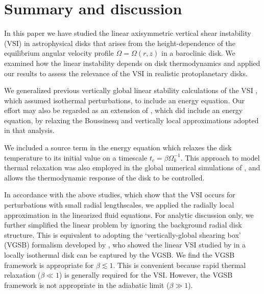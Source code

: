 \section{Summary and discussion}\label{summary}
In this paper we have studied the linear axisymmetric vertical shear
instability (VSI) in astrophysical disks that arises from the
height-dependence of the equilibrium angular velocity profile
$\Omega=\Omega(r,z)$ in a baroclinic disk. We examined how
the linear instability depends on disk thermodynamics and applied our
results to assess the relevance of the VSI in realistic protoplanetary
disks.  


We generalized previous vertically global linear stability calculations
of the VSI \citep{nelson13,mcnally14}, which assumed isothermal
perturbations, to include an energy equation. Our effort may also be
regarded as an extension of \cite{urpin03}, which did include an
energy equation, by relaxing the Boussinesq and vertically local
approximations adopted in that analysis.      

We included a source term in the energy equation which relaxes the disk
temperature to its initial value on a timescale
$t_c=\beta\Omega_k^{-1}$. This approach to model thermal relaxation was also
employed in the global numerical simulations of \cite{nelson13}, and
allows the thermodynamic response of the disk to be controlled.    

In accordance with the above studies, which show that the VSI occurs for 
perturbations with small radial lengthscales, we applied the 
radially local approximation in the linearized fluid equations. For
analytic discussion only, we further simplified the linear problem by
ignoring the background radial disk structure. This is equivalent to adopting
the `vertically-global shearing box' (VGSB) formalism developed by
\cite{mcnally14}, who showed the linear VSI studied by
\cite{nelson13} in a locally isothermal disk can be captured by the
VGSB. We find the VGSB framework is appropriate for $\beta\lesssim1$. 
This is convenient because rapid thermal relaxation ($\beta\ll1$) is
generally required for the VSI.  However,
the VGSB framework is not appropriate in the adiabatic limit ($\beta \gg
1$). 
   
